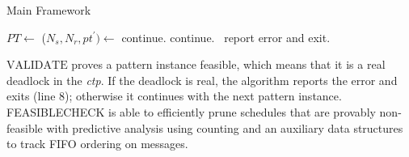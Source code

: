 \begin{algorithm}[t]
\caption{Main Framework}\label{algo:main}
\begin{algorithmic}[1]
\State  $\mathit{PT} \gets$ 
\State ($\mathit{N_s}, \mathit{N_r}, \mathit{pt^\prime})\gets$
\State continue.
\State continue.
\Else\ report error and exit.
\EndIf

\EndFor
\end{algorithmic}
\end{algorithm}


$\mathrm{VALIDATE}$ proves a pattern instance feasible, which means that it is a real deadlock in the \emph{ctp}. If the deadlock is real, the algorithm reports the error and exits (line 8); otherwise it continues with the next pattern instance.
\textrm{FEASIBLECHECK} is able to efficiently prune schedules that are provably non-feasible with predictive analysis using counting and an auxiliary data structures to track FIFO ordering on messages. 

